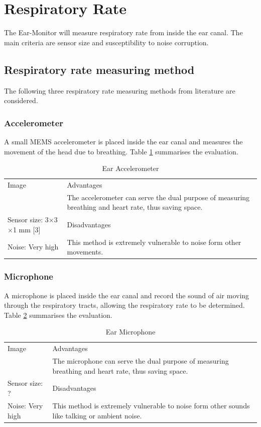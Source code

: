 \section{Respiratory Rate}
The Ear-Monitor will measure respiratory rate from inside the ear canal. The main criteria are sensor size and susceptibility to noise corruption.

\subsection{Respiratory rate measuring method}
The following three respiratory rate measuring methods from literature are considered.

\subsubsection{Accelerometer}
A small MEMS accelerometer is placed inside the ear canal and measures the movement of the head due to breathing. Table \ref{tab:EarAccelerometer_Eval} summarises the evaluation.

\begin{table}[H]
\caption{Ear Accelerometer}
\label{tab:EarAccelerometer_Eval}
\renewcommand{\arraystretch}{1.3}	%
\centering
\begin{tabular}{|p{5cm}|p{8cm}|} 
 \hline
 Image 		& 	Advantages  \\ 
  			&	\tabitem The accelerometer can serve the dual purpose of measuring breathing and heart rate, thus saving space.\\
\hline
Sensor size: 3$\times$3$\times$1 mm	[3]					&	Disadvantages  \\ 
Noise: Very high							&	\tabitem This method is extremely vulnerable to noise form other movements.\\
 \hline
\end{tabular}
\end{table}

\subsubsection{Microphone}
A microphone is placed inside the ear canal and record the sound of air moving through the respiratory tracts, allowing the respiratory rate to be determined. Table \ref{tab:EarMicrophone_Eval} summarises the evaluation.

\begin{table}[H]
\caption{Ear Microphone}
\label{tab:EarMicrophone_Eval}
\renewcommand{\arraystretch}{1.3}	%
\centering
\begin{tabular}{|p{5cm}|p{8cm}|} 
 \hline
 Image 		& 	Advantages  \\ 
  			&	\tabitem The microphone can serve the dual purpose of measuring breathing and heart rate, thus saving space.\\
\hline
Sensor size: ?					&	Disadvantages  \\ 
Noise: Very high	&	\tabitem This method is extremely vulnerable to noise form other sounds like talking or ambient noise.\\
 \hline
\end{tabular}
\end{table}


